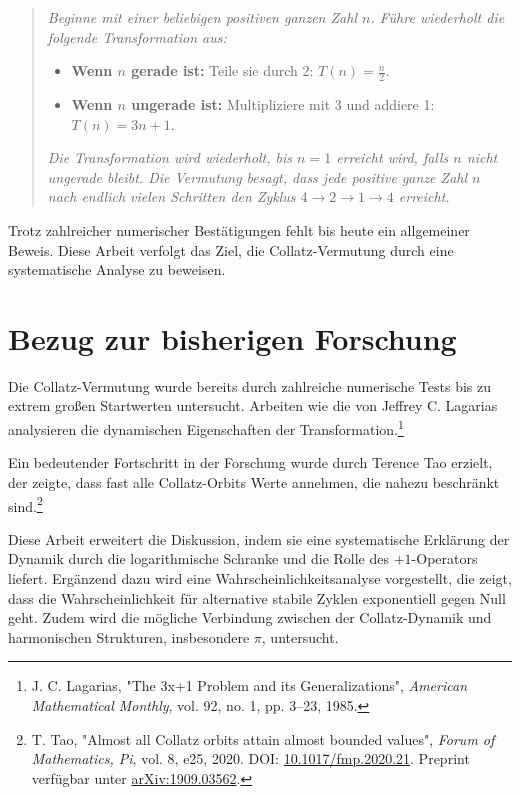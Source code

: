 \documentclass[a4paper,12pt]{article}
\begin{document}
\begin{quote}
\textit{Beginne mit einer beliebigen positiven ganzen Zahl \( n \). Führe wiederholt die folgende Transformation aus:}
\begin{itemize}
    \item \textbf{Wenn \( n \) gerade ist:} Teile sie durch 2: \( T(n) = \frac{n}{2} \).
    \item \textbf{Wenn \( n \) ungerade ist:} Multipliziere mit 3 und addiere 1: \( T(n) = 3n + 1 \).
\end{itemize}
\textit{Die Transformation wird wiederholt, bis \( n = 1 \) erreicht wird, falls \( n \) nicht ungerade bleibt. Die Vermutung besagt, dass jede positive ganze Zahl \( n \) nach endlich vielen Schritten den Zyklus \( 4 \to 2 \to 1 \to 4 \) erreicht.}
\end{quote}

Trotz zahlreicher numerischer Bestätigungen fehlt bis heute ein allgemeiner Beweis. Diese Arbeit verfolgt das Ziel, die Collatz-Vermutung durch eine systematische Analyse zu beweisen.


\section{Bezug zur bisherigen Forschung}
Die Collatz-Vermutung wurde bereits durch zahlreiche numerische Tests bis zu extrem großen Startwerten untersucht. Arbeiten wie die von Jeffrey C. Lagarias analysieren die dynamischen Eigenschaften der Transformation.\footnote{J. C. Lagarias, "The 3x+1 Problem and its Generalizations", \textit{American Mathematical Monthly}, vol. 92, no. 1, pp. 3–23, 1985.} 

Ein bedeutender Fortschritt in der Forschung wurde durch Terence Tao erzielt, der zeigte, dass fast alle Collatz-Orbits Werte annehmen, die nahezu beschränkt sind.\footnote{T. Tao, "Almost all Collatz orbits attain almost bounded values", \textit{Forum of Mathematics, Pi}, vol. 8, e25, 2020. DOI: \href{https://doi.org/10.1017/fmp.2020.21}{10.1017/fmp.2020.21}. Preprint verfügbar unter \href{https://arxiv.org/abs/1909.03562}{arXiv:1909.03562}.} 

Diese Arbeit erweitert die Diskussion, indem sie eine systematische Erklärung der Dynamik durch die logarithmische Schranke und die Rolle des \(+1\)-Operators liefert. Ergänzend dazu wird eine Wahrscheinlichkeitsanalyse vorgestellt, die zeigt, dass die Wahrscheinlichkeit für alternative stabile Zyklen exponentiell gegen Null geht. Zudem wird die mögliche Verbindung zwischen der Collatz-Dynamik und harmonischen Strukturen, insbesondere \(\pi\), untersucht.
\end{document}
